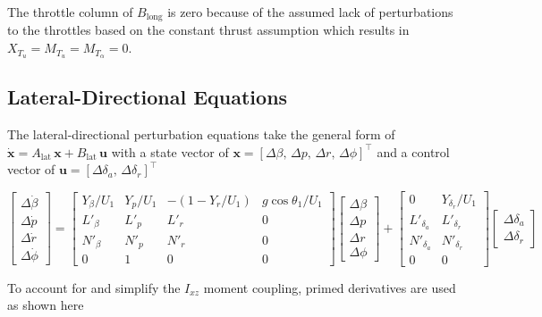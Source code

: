 \documentclass[11pt]{article}
\begin{document}
The throttle column of $B_\text{long}$ is zero because of the assumed lack of perturbations to the throttles
based on the constant thrust assumption which results in $X_{T_u} = M_{T_u} = M_{T_\alpha} = 0$.

\subsection{Lateral-Directional Equations}

The lateral-directional perturbation equations take the general form of
$\dot{\mathbf{x}} = A_\text{lat}\,\mathbf{x} + B_\text{lat}\,\mathbf{u}$ with a
state vector of $\mathbf{x} = [\Delta\beta,\,\Delta p,\,\Delta r,\,\Delta\phi]^\top$
and a control vector of $\mathbf{u} = [\Delta\delta_a,\,\Delta\delta_r]^\top$

\begin{equation}\label{eq:equation_53}
\begin{bmatrix} \Delta\dot\beta \\ \Delta\dot p \\ \Delta\dot r \\ \Delta\dot\phi \end{bmatrix}
=
\begin{bmatrix}
Y_\beta/U_1 & Y_p/U_1 & -(1 - Y_r/U_1) & g\cos\theta_1/U_1 \\
L'_\beta    & L'_p    & L'_r           & 0 \\
N'_\beta    & N'_p    & N'_r           & 0 \\
0           & 1       & 0              & 0
\end{bmatrix}
\begin{bmatrix} \Delta\beta \\ \Delta p \\ \Delta r \\ \Delta\phi \end{bmatrix}
+
\begin{bmatrix}
0           & Y_{\delta_r}/U_1 \\
L'_{\delta_a} & L'_{\delta_r} \\
N'_{\delta_a} & N'_{\delta_r} \\
0           & 0
\end{bmatrix}
\begin{bmatrix} \Delta\delta_a \\ \Delta\delta_r \end{bmatrix}
\end{equation}

To account for and simplify the $I_{xz}$ moment coupling, primed derivatives are used as shown here
\end{document}
